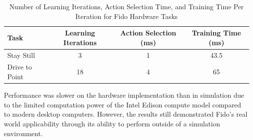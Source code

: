 \begin{table}[ht]
	\centering
	\begin{tabular}{@{}lccc@{}}
		\toprule
		Task             & Learning Iterations & Action Selection (ms) & Training Time (ms) \\ \midrule
		Stay Still       & 3                   & 1                    & 43.5                  \\
		Drive to Point   & 18                  & 4                     & 65                  \\
	\end{tabular}
	\caption{Number of Learning Iterations, Action Selection Time, and Training Time Per Iteration for Fido Hardware Tasks}
	\label{tab:data2}
\end{table}

Performance was slower on the hardware implementation than in simulation due to the limited computation power of the Intel Edison compute model compared to modern desktop computers.
 However, the results still demonstrated Fido's real world applicability through its ability to perform outside of a simulation environment.